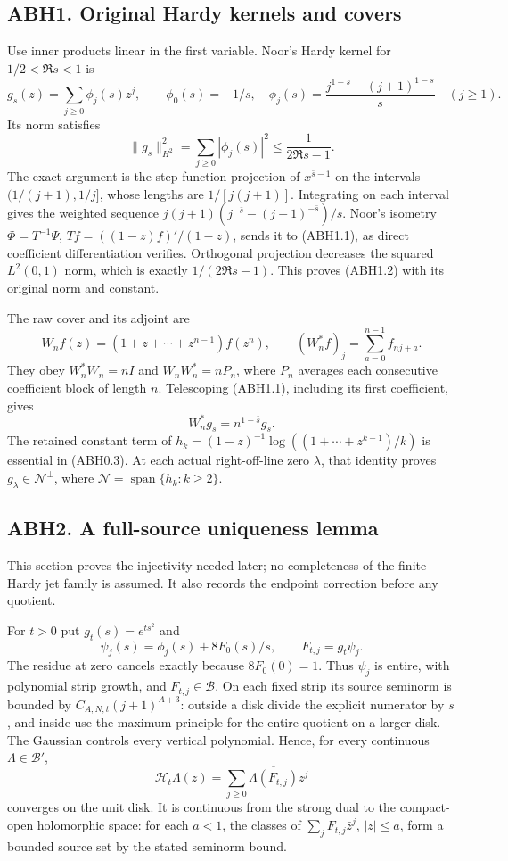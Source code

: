 \subsection{ABH1. Original Hardy kernels and
covers}\label{abh1.-original-hardy-kernels-and-covers}

Use inner products linear in the first variable. Noor's Hardy kernel for
\(1/2<\Re s<1\) is \[
g_s(z)=\sum_{j\ge0}\overline{\phi_j(s)}z^j,\qquad
\phi_0(s)=-1/s,\quad
\phi_j(s)=\frac{j^{1-s}-(j+1)^{1-s}}s\quad(j\ge1).
\tag{ABH1.1}
\] Its norm satisfies \[
\|g_s\|_{H^2}^2
=\sum_{j\ge0}|\phi_j(s)|^2\le\frac1{2\Re s-1}.
\tag{ABH1.2}
\] The exact argument is the step-function projection of
\(x^{\bar s-1}\) on the intervals \((1/(j+1),1/j]\), whose lengths are
\(1/[j(j+1)]\). Integrating on each interval gives the weighted sequence
\(j(j+1)(j^{-\bar s}-(j+1)^{-\bar s})/\bar s\). Noor's isometry
\(\Phi=T^{-1}\Psi\), \(Tf=((1-z)f)'/(1-z)\), sends it to (ABH1.1), as
direct coefficient differentiation verifies. Orthogonal projection
decreases the squared \(L^2(0,1)\) norm, which is exactly
\(1/(2\Re s-1)\). This proves (ABH1.2) with its original norm and
constant.

The raw cover and its adjoint are \[
W_nf(z)=(1+z+\cdots+z^{n-1})f(z^n),\qquad
(W_n^*f)_j=\sum_{a=0}^{n-1}f_{nj+a}.
\tag{ABH1.3}
\] They obey \(W_n^*W_n=nI\) and \(W_nW_n^*=nP_n\), where \(P_n\)
averages each consecutive coefficient block of length \(n\). Telescoping
(ABH1.1), including its first coefficient, gives \[
W_n^*g_s=n^{1-\bar s}g_s.
\tag{ABH1.4}
\] The retained constant term of
\(h_k=(1-z)^{-1}\log((1+\cdots+z^{k-1})/k)\) is essential in (ABH0.3).
At each actual right-off-line zero \(\lambda\), that identity proves
\(g_\lambda\in\mathcal N^\perp\), where
\(\mathcal N=\operatorname{span}\{h_k:k\ge2\}\).

\subsection{ABH2. A full-source uniqueness
lemma}\label{abh2.-a-full-source-uniqueness-lemma}

This section proves the injectivity needed later; no completeness of the
finite Hardy jet family is assumed. It also records the endpoint
correction before any quotient.

For \(t>0\) put \(g_t(s)=e^{ts^2}\) and \[
\psi_j(s)=\phi_j(s)+8F_0(s)/s,\qquad F_{t,j}=g_t\psi_j.
\tag{ABH2.1}
\] The residue at zero cancels exactly because \(8F_0(0)=1\). Thus
\(\psi_j\) is entire, with polynomial strip growth, and
\(F_{t,j}\in\mathcal B\). On each fixed strip its source seminorm is
bounded by \(C_{A,N,t}(j+1)^{A+3}\): outside a disk divide the explicit
numerator by \(s\), and inside use the maximum principle for the entire
quotient on a larger disk. The Gaussian controls every vertical
polynomial. Hence, for every continuous \(\Lambda\in\mathcal B'\), \[
\mathcal H_t\Lambda(z)=\sum_{j\ge0}\overline{\Lambda(F_{t,j})}z^j
\tag{ABH2.2}
\] converges on the unit disk. It is continuous from the strong dual to
the compact-open holomorphic space: for each \(a<1\), the classes of
\(\sum_jF_{t,j}\bar z^j\), \(|z|\le a\), form a bounded source set by
the stated seminorm bound.

